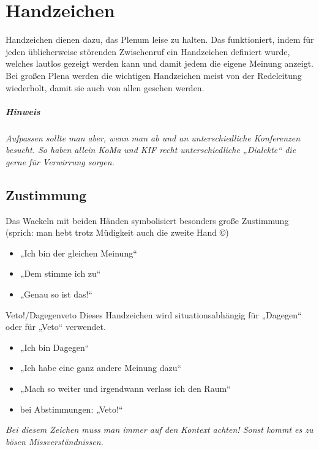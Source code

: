 \chapter{Handzeichen}\label{sec:handzeichen}

Handzeichen dienen dazu, das Plenum leise zu halten. Das funktioniert, indem
für jeden üblicherweise störenden Zwischenruf ein Handzeichen definiert wurde,
welches lautlos gezeigt werden kann und damit jedem die eigene Meinung anzeigt.
Bei großen Plena werden die wichtigen Handzeichen meist von der Redeleitung
wiederholt, damit sie auch von allen gesehen werden.

\paragraph{Hinweis} \emph{Aufpassen sollte man aber, wenn man ab und an
unterschiedliche Konferenzen besucht. So haben allein KoMa und KIF recht
unterschiedliche „Dialekte“ die gerne für Verwirrung sorgen.}

\section{Zustimmung}
Das Wackeln mit beiden Händen symbolisiert %
besonders große Zustimmung (sprich: man hebt trotz Müdigkeit auch die zweite
Hand ©) %
\begin{itemize}
	\item „Ich bin der gleichen Meinung“
	\item „Dem stimme ich zu“
	\item „Genau so ist das!“
\end{itemize}

\begin{handzeichen}{Veto!/Dagegen}{veto}
Dieses Handzeichen wird situationsabhängig für „Dagegen“ oder für „Veto“
verwendet.
\begin{itemize}
	\item „Ich bin Dagegen“
	\item „Ich habe eine ganz andere Meinung dazu“
	\item „Mach so weiter und irgendwann verlass ich den Raum“
	\item bei Abstimmungen: „Veto!“
\end{itemize}
\end{handzeichen}

\emph{Bei diesem Zeichen muss man immer auf den Kontext achten! Sonst kommt es
zu bösen Missverständnissen.}

